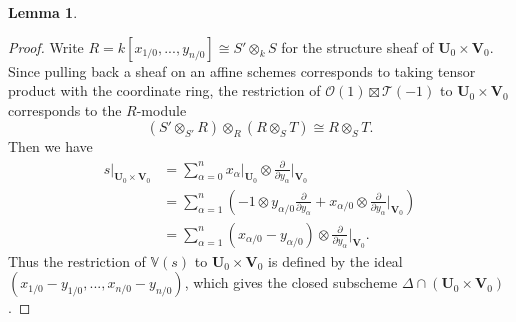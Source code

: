 \documentclass[a4paper]{article}
\theoremstyle{definition}
\newtheorem{lemma}[defn]{Lemma}
\theoremstyle{remark}
\begin{document}
\begin{lemma}
\begin{proof}
        Write \(R=k[x_{1/0},...,y_{n/0}]\cong S'\otimes_k S\) for the structure
        sheaf of \(\mathbf{U}_0\times \mathbf{V}_0\). Since pulling back a sheaf
        on an affine schemes corresponds to taking tensor product with the
        coordinate ring, the restriction of \(\mathscr{O}(1)\boxtimes
        \mathscr{T}(-1)\) to \(\mathbf{U}_0\times \mathbf{V}_0\) corresponds to
        the \(R\)-module
        \[ (S'\otimes_{S'}R)\otimes_R  (R\otimes_S T) \cong R\otimes_S T.\] 
        Then we have 
        \begin{align*}
            s\big|_{\mathbf{U}_0\times \mathbf{V}_0} 
            &= \sum_{\alpha = 0}^{n} x_\alpha\bigg|_{\mathbf{U}_0}\otimes
            \frac{\partial}{\partial y_\alpha}\bigg|_{\mathbf{V}_0} \\ 
            &= \sum_{\alpha=1}^{n} \left(-1\otimes
            y_{\alpha/0}\frac{\partial}{\partial y_\alpha} +
            x_{\alpha/0}\otimes \frac{\partial}{\partial
            y_\alpha}\bigg|_{\mathbf{V}_0}\right) \\ 
            &= \sum_{\alpha=1}^{n}(x_{\alpha/0}-y_{\alpha/0}) \otimes
            \frac{\partial}{\partial y_\alpha}\bigg|_{\mathbf{V}_0}.
        \end{align*}
        Thus the restriction of \(\mathbb{V}(s)\) to \(\mathbf{U}_0\times
        \mathbf{V}_0\) is defined by the ideal \((x_{1/0}-y_{1/0},
        ...,x_{n/0}-y_{n/0})\), which gives the closed subscheme \(\Delta \cap
        (\mathbf{U}_0\times \mathbf{V}_0)\).
    \end{proof}
\end{lemma}
\end{document}
